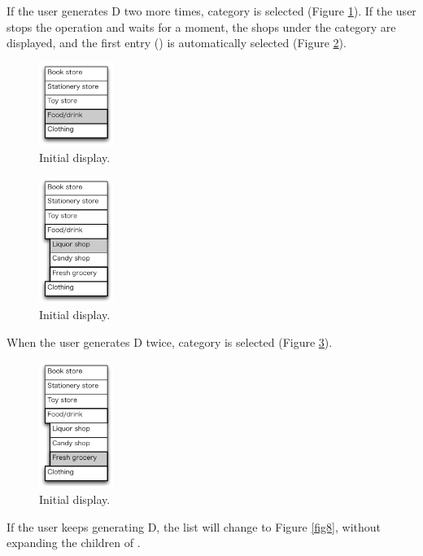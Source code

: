 \documentclass{article}
\begin{document}
If the user generates D two more times, 
 category is selected (Figure \ref{fig4}).
If the user stops the operation and waits for a moment, the shops under the 
category are displayed, and the first entry () is automatically selected (Figure \ref{fig5}).

\begin{figure}[H]
\centerline{\includegraphics[width=24mm,bb=0 0 139 157]{figures/fig4.pdf}}
\caption{Initial display.}
\label{fig4}
\end{figure}

\begin{figure}[H]
\centerline{\includegraphics[width=24mm,bb=0 0 139 238]{figures/fig5.pdf}}
\caption{Initial display.}
\label{fig5}
\end{figure}

When the user generates D twice,
 category is selected (Figure \ref{fig6}).

\begin{figure}[H]
\centerline{\includegraphics[width=24mm,bb=0 0 139 238]{figures/fig6.pdf}}
\caption{Initial display.}
\label{fig6}
\end{figure}

If the user keeps generating D, 
the list will change to Figure \ref{fig8},
without expanding the children of .
\end{document}
